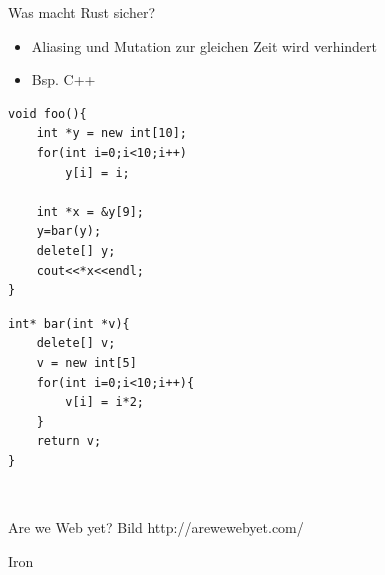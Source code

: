 \documentclass[12pt]{beamer}
\begin{document}
\begin{frame}[fragile=singleslide]{Was macht Rust sicher?}
\begin{itemize}
    \item Aliasing und Mutation zur gleichen Zeit wird verhindert
   	\item Bsp. C++   	
\end{itemize}
\begin{minipage}[t]{.49\textwidth}
\begin{lstlisting}
void foo(){ 
	int *y = new int[10];	
	for(int i=0;i<10;i++)
		y[i] = i;

	int *x = &y[9];
	y=bar(y);	
	delete[] y;		
	cout<<*x<<endl;
}
\end{lstlisting}				
\end{minipage}
\hfill
\begin{minipage}[t]{.49\textwidth}
\begin{lstlisting}
int* bar(int *v){
	delete[] v;	
	v = new int[5]	
	for(int i=0;i<10;i++){
		v[i] = i*2;
	}	
	return v;
}
\end{lstlisting}				
\end{minipage}\\
\end{frame}

\begin{frame}{Are we Web yet?}
Bild http://arewewebyet.com/
\end{frame}

\begin{frame}{Iron}

\end{frame}
\end{document}

